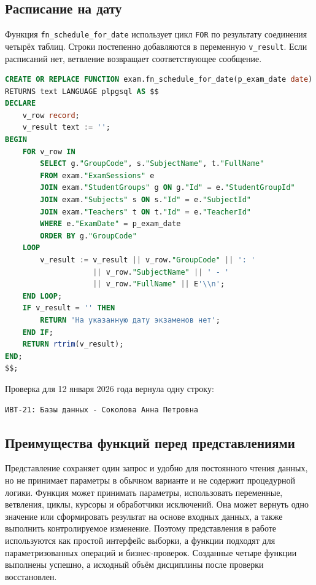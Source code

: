 \documentclass[12pt,a4paper]{article}
\begin{document}
\subsection*{Расписание на дату}
Функция \texttt{fn\_schedule\_for\_date} использует цикл \texttt{FOR}
по результату соединения четырёх таблиц. Строки постепенно добавляются
в переменную \texttt{v\_result}. Если расписаний нет, ветвление возвращает
соответствующее сообщение.
\begin{lstlisting}[language=SQL]
CREATE OR REPLACE FUNCTION exam.fn_schedule_for_date(p_exam_date date)
RETURNS text LANGUAGE plpgsql AS $$
DECLARE
    v_row record;
    v_result text := '';
BEGIN
    FOR v_row IN
        SELECT g."GroupCode", s."SubjectName", t."FullName"
        FROM exam."ExamSessions" e
        JOIN exam."StudentGroups" g ON g."Id" = e."StudentGroupId"
        JOIN exam."Subjects" s ON s."Id" = e."SubjectId"
        JOIN exam."Teachers" t ON t."Id" = e."TeacherId"
        WHERE e."ExamDate" = p_exam_date
        ORDER BY g."GroupCode"
    LOOP
        v_result := v_result || v_row."GroupCode" || ': '
                    || v_row."SubjectName" || ' - '
                    || v_row."FullName" || E'\\n';
    END LOOP;
    IF v_result = '' THEN
        RETURN 'На указанную дату экзаменов нет';
    END IF;
    RETURN rtrim(v_result);
END;
$$;
\end{lstlisting}
Проверка для 12 января 2026 года вернула одну строку:
\begin{lstlisting}
ИВТ-21: Базы данных - Соколова Анна Петровна
\end{lstlisting}

\subsection*{Преимущества функций перед представлениями}
Представление сохраняет один запрос и удобно для постоянного чтения
данных, но не принимает параметры в обычном варианте и не содержит
процедурной логики. Функция может принимать параметры, использовать
переменные, ветвления, циклы, курсоры и обработчики исключений. Она может
вернуть одно значение или сформировать результат на основе входных данных,
а также выполнить контролируемое изменение. Поэтому представления в работе
используются как простой интерфейс выборки, а функции подходят для
параметризованных операций и бизнес-проверок. Созданные четыре функции
выполнены успешно, а исходный объём дисциплины после проверки восстановлен.
\end{document}
